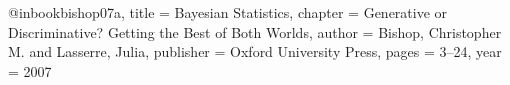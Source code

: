 @inbook{bishop07a,
  title     = {{B}ayesian {S}tatistics},
  chapter   = {{G}enerative or {D}iscriminative? 
               {G}etting the {B}est of {B}oth {W}orlds},
  author    = {Bishop, Christopher M. and Lasserre, Julia},
  publisher = {Oxford University Press},
  pages     = {3--24},
  year      = {2007}
}
